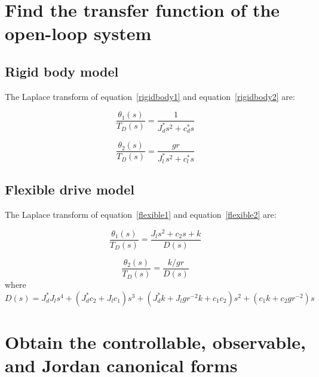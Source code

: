 \documentclass[a4paper, 12pt]{article}
\begin{document}
\vspace{7ex}
\section{Find the transfer function of the open-loop system}
\subsection{Rigid body model}
\hspace{2.5ex}
The Laplace transform of equation~\ref{rigidbody1} and equation~\ref{rigidbody2} are:

\begin{equation}\label{laplacerigidbody1}
\dfrac{\theta_1 (s)}{T_D(s)} = \dfrac{1}{J_d^*s^2 + c_d^* s}
\end{equation}

\begin{equation} \label{laplacerigidbody2}
\dfrac{\theta_2 (s)}{T_D(s)} = \dfrac{gr}{J_l^* s^2 + c_l^*s} 
\end{equation}

\subsection{Flexible drive model}
The Laplace transform of equation~\ref{flexible1} and equation~\ref{flexible2} are:

\begin{equation} \label{laplaceflexible1}
\dfrac{\theta_1(s)}{T_D(s)} = \dfrac{J_l s^2 + c_2 s + k}{D(s)}
\end{equation}

\begin{equation} \label{laplaceflexible2}
\dfrac{\theta_2 (s)}{T_D (s)} = \dfrac{k/gr}{D(s)}
\end{equation}
where \begin{equation} \label{D(s)}
D(s) = J_d^*J_l s^4 +(J_d^*c_2 + J_lc_1) s^3 +(J_d^*k + J_lgr^{-2} k + c_1c_2) s^2 +(c_1k + c_2gr^{-2})s 
\end{equation}

\vspace{7ex}
\section{Obtain the controllable, observable, and Jordan canonical forms}
\end{document}
